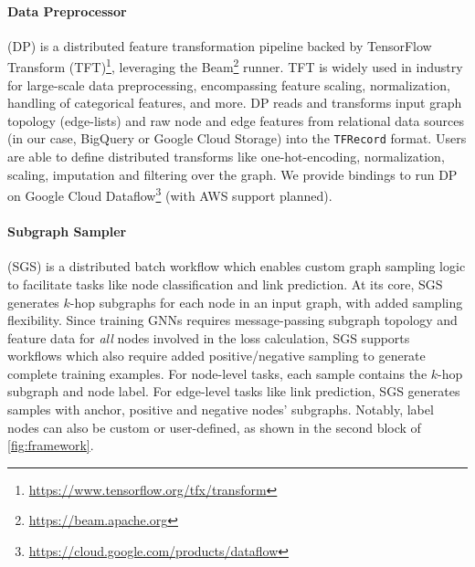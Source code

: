 \paragraph{Data Preprocessor} (DP)
is a distributed feature transformation pipeline backed by TensorFlow Transform (TFT)\footnote{\url{https://www.tensorflow.org/tfx/transform}},  leveraging the Beam\footnote{\url{https://beam.apache.org}} runner.  TFT is widely used in industry for large-scale data preprocessing, encompassing feature scaling, normalization, handling of categorical features, and more.  DP reads and transforms input graph topology (edge-lists) and raw node and edge features from relational data sources (in our case, BigQuery or Google Cloud Storage) into the \texttt{TFRecord} format.  Users are able to define distributed transforms like one-hot-encoding, normalization, scaling,   imputation and filtering over the graph.  We provide bindings to run DP on Google Cloud Dataflow\footnote{\url{https://cloud.google.com/products/dataflow}} (with AWS support planned).

\paragraph{Subgraph Sampler} (SGS)
is a distributed batch workflow which enables custom graph sampling logic to facilitate tasks like node classification and link prediction. At its core, SGS generates $k$-hop subgraphs for each node in an input graph, with added sampling flexibility.  Since training GNNs requires message-passing subgraph topology and feature data for \emph{all} nodes involved in the loss calculation, SGS supports workflows which also require added positive/negative sampling to generate complete training examples.  For node-level tasks, each sample contains the $k$-hop subgraph and node label. For edge-level tasks like link prediction, SGS generates samples with anchor, positive and negative nodes' subgraphs. Notably, label nodes can also be custom or user-defined, as shown in the second block of \cref{fig:framework}.

